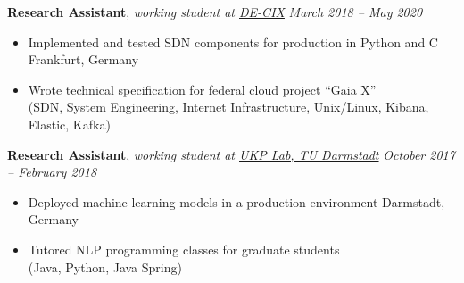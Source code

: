 \documentclass[9pt]{extarticle}
\begin{document}
\noindent
{\bf Research Assistant}, \textit{working student at \href{https://www.de-cix.net/}{DE-CIX}}   \hfill \textit{March 2018 -- May 2020}
\begin{itemize}
\setlength\itemsep{0.05em}
\item Implemented and tested SDN components for production in Python and C \hfill Frankfurt, Germany
\item Wrote technical specification for federal cloud project “Gaia X” \\
(SDN, System Engineering, Internet Infrastructure, Unix/Linux, Kibana, Elastic, Kafka) \\
\end{itemize}

\noindent
{\bf Research Assistant}, \textit{working student at \href{https://www.informatik.tu-darmstadt.de/ukp/ukp_home/index.en.jsp}{UKP Lab, TU Darmstadt}}  \hfill \textit{October 2017 -- February 2018}
\begin{itemize}
\setlength\itemsep{0.05em}
    \item Deployed machine learning models in a production environment \hfill Darmstadt, Germany
    \item Tutored NLP programming classes for graduate students \\
    (Java, Python, Java Spring) \\
\end{itemize}
\end{document}

